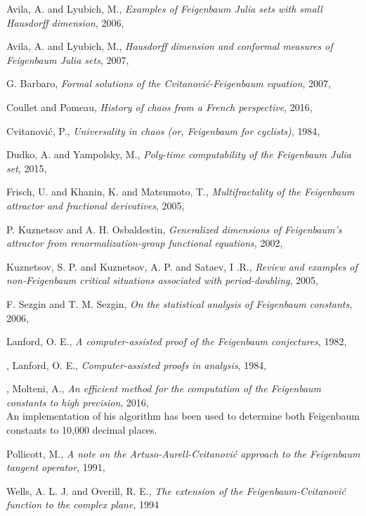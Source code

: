 \begin{description}
{Avila, A. and Lyubich, M.},
  {\em Examples of {Feigenbaum Julia} sets with small {Hausdorff} dimension},
{2006},

{Avila, A. and Lyubich, M.},
  {\em Hausdorff dimension and conformal measures of {Feigenbaum Julia} sets},
{2007},

{G. Barbaro},
{\em Formal solutions of the {Cvitanovi{\'c}-Feigenbaum} equation},
{2007},

{Coullet and Pomeau},
{\em History of chaos from a {French} perspective},
{2016},

{Cvitanovi{\'c}, P.},
{\em Universality in chaos (or, {Feigenbaum} for cyclists)},
{1984},

{Dudko, A. and Yampolsky, M.},
  {\em Poly-time computability of the {Feigenbaum Julia} set},
{2015},

{Frisch, U. and Khanin, K. and Matsumoto, T.},
{\em Multifractality of the {Feigenbaum} attractor and fractional derivatives},
{2005},

{P. Kuznetsov and A. H. Osbaldestin},
{\em Generalized dimensions of {Feigenbaum}'s attractor from renormalization-group functional equations},
{2002},

{Kuznetsov, S. P. and Kuznetsov, A. P. and Sataev, I .R.},
{\em Review and examples of non-{Feigenbaum} critical situations associated with period-doubling},
{2005},

{F. Sezgin and T. M. Sezgin},
{\em On the statistical analysis of {Feigenbaum} constants},
{2006},

{{Lanford}, O. E.},
{\em A computer-assisted proof of the {Feigenbaum} conjectures},
{1982},

,
{{Lanford}, O. E.},
{\em Computer-assisted proofs in analysis},
{1984},

,
{Molteni, A.},
{\em An efficient method for the computation of the {Feigenbaum} constants to high precision},
{2016},
\\
An implementation of his algorithm  has been used to determine both Feigenbaum 
constants to 10,000 decimal places. 

{Pollicott, M.},
{\em A note on the {Artuso-Aurell-Cvitanovi{\'c}} approach to the {Feigenbaum} tangent operator},
{1991},

{Wells, A. L. J. and Overill, R. E.},
{\em The extension of the {Feigenbaum-Cvitanovi{\'c}} function to the complex plane},
{1994}


\end{description}
